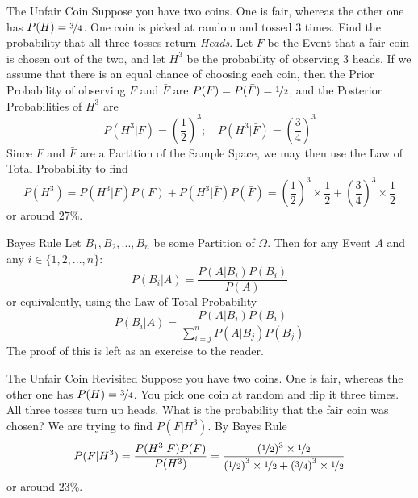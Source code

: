 \documentclass{report}
\begin{document}
\begin{example}{The Unfair Coin}
    Suppose you have two coins. One is fair, whereas the other one has $P(H)=\nicefrac 34$. One coin is picked at random and tossed 3 times. Find the probability that all three tosses return \emph{Heads}.
\tcblower
Let $F$ be the Event that a fair coin is chosen out of the two, and let $H^3$ be the probability of observing 3 heads. If we assume that there is an equal chance of choosing each coin, then the Prior Probability of observing $F$ and $\bar F$ are $P(F)=P(\bar F)=\nicefrac 12$, and the Posterior Probabilities of $H^3$ are
\[
    P(H^3 | F) = \left(\frac 12\right)^3;\quad P(H^3 | \bar F) = \left(\frac 34\right)^3
\]
Since $F$ and $\bar F$ are a Partition of the Sample Space, we may then use the Law of Total Probability to find
\[
    P(H^3) = P(H^3|F)P(F)+P(H^3|\bar F)P(\bar F)= \left(\frac 12\right)^3\times \frac 12 + \left(\frac 34\right)^3\times\frac 12
\]
or around $27\%$.
\end{example}
    

\begin{theorem}{Bayes Rule}
    Let $B_1,B_2,...,B_n$ be some Partition of $\Omega$. Then for any Event $A$ and any $i\in \{1,2,...,n\}$:
    \[
        P(B_i\vert A) = \frac{P(A\vert B_i)P(B_i)}{P(A)}
    \]
    or equivalently, using the Law of Total Probability
    \[
        P(B_i\vert A) = \frac{P(A\vert B_i)P(B_i)}{\sum_{i=j}^n P(A|B_j)P(B_j)}
    \]
    \tcblower
    The proof of this is left as an exercise to the reader. 
\end{theorem}

\begin{example}{The Unfair Coin Revisited}
    Suppose you have two coins. One is fair, whereas the other one has $P(H)=\nicefrac 34$. You pick one coin at random and flip it three times. All three tosses turn up heads. What is the probability that the fair coin was chosen?
\tcblower
    We are trying to find $P(F|H^3)$. By Bayes Rule
    \[
        P(F | H^3) = \frac {P(H^3| F)P(F)}{P(H^3)} = \frac{(\nicefrac 12)^3\times \nicefrac 12}{\left(\nicefrac 12\right)^3\times \nicefrac 12 + \left(\nicefrac 34\right)^3\times\nicefrac 12}
    \]
    or around $23\%$.
\end{example}
\end{document}
